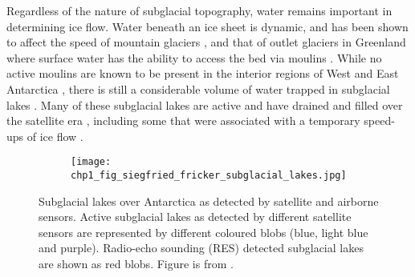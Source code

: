 Regardless of the nature of subglacial topography, water remains important in determining ice flow.
Water beneath an ice sheet is dynamic, and has been shown to affect the speed of mountain glaciers \citep[e.g.][]{IkenUpliftUnteraargletscherBeginning1983}, and that of outlet glaciers in Greenland where surface water has the ability to access the bed via moulins \citep{ZwallySurfaceMeltInducedAcceleration2002}.
While no active moulins are known to be present in the interior regions of West and East Antarctica \citep{DirscherlAutomatedMappingAntarctic2020,StokesWidespreaddistributionsupraglacial2019}, there is still a considerable volume of water trapped in subglacial lakes \citep{WrightfourthinventoryAntarctic2012}.
Many of these subglacial lakes are active and have drained and filled over the satellite era \citep[Fig.~\ref{fig:1.4},][]{Smithinventoryactivesubglacial2009,SiegfriedThirteenyearssubglacial2018}, including some that were associated with a temporary speed-ups of ice flow \citep[e.g.][]{Scambostriggeringsubglaciallake2011,BellLargesubglaciallakes2007,StearnsIncreasedflowspeed2008,WrightSubglacialhydrologicalconnectivity2014}.

\begin{figure}[htb]
  \centering
  \begin{subfigure}[t]{1.0\textwidth}
    \texttt{[image: chp1\_fig\_siegfried\_fricker\_subglacial\_lakes.jpg]}
    \label{fig:1.4a}
  \end{subfigure}
  \caption[Map of radio-echo sounding and satellite-detected subglacial lakes in Antarctica]{
    Subglacial lakes over Antarctica as detected by satellite and airborne sensors.
    Active subglacial lakes as detected by different satellite sensors are represented by different coloured blobs (blue, light blue and purple).
    Radio-echo sounding (RES) detected subglacial lakes are shown as red blobs.
    Figure is from \citet{SiegfriedThirteenyearssubglacial2018}.
  }
  \label{fig:1.4}
\end{figure}

